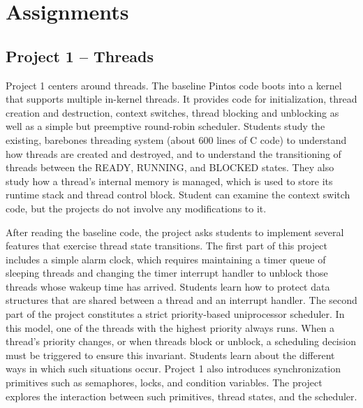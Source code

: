 \section{Assignments}
\label{sec:assignments}

\pintostestcounttable{}

%
%

\subsection{Project 1 -- Threads}
Project 1 centers around threads.  The baseline Pintos code boots into a kernel that
supports multiple in-kernel threads.  It provides code for initialization, thread creation and
destruction, context switches, thread blocking and unblocking as well as a simple but
preemptive round-robin scheduler.
Students study the existing, barebones threading system (about 600 lines of C code) to 
understand how threads are created and destroyed, and to understand the transitioning of 
threads between the READY, RUNNING, and BLOCKED states.  They also study how a thread's
internal memory is managed, which is used to store its runtime stack and thread control block.
Student can examine the context switch code, but the projects do not involve any modifications
to it.

After reading the baseline code, the project asks students to implement several features
that exercise thread state transitions.  The first part of this project includes a simple
alarm clock, which requires maintaining a timer queue of sleeping threads and changing 
the timer interrupt handler to unblock those threads whose wakeup time has arrived.
Students learn how to protect data structures that are shared between a thread and an
interrupt handler.  The second part of the project constitutes a strict priority-based
uniprocessor scheduler.  In this model, one of the threads with the highest priority
always runs.  When a thread's priority changes, or when threads block or unblock,  
a scheduling decision must be triggered to ensure this invariant.  Students learn about
the different ways in which such situations occur.  
Project 1 also introduces synchronization primitives such as semaphores, locks,
and condition variables.  The project explores the interaction between such primitives,
thread states, and the scheduler.


